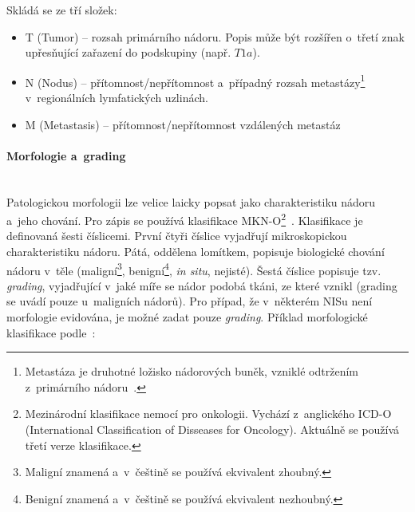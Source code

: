 \documentclass[11pt, final, oneside]{fithesis2}
\newcommand{\paragraphNewLine}[1]{\paragraph*{#1}\mbox{}\\}
\begin{document}
Skládá se ze tří složek:
\begin{itemize}
	\item T (Tumor) -- rozsah primárního nádoru. Popis může být rozšířen o~třetí znak upřesňující zařazení do podskupiny (např. $T1a$).
	
	\item N (Nodus) -- přítomnost/nepřítomnost a~případný rozsah metastázy\footnote{Metastáza je druhotné ložisko nádorových buněk, vzniklé odtržením z~primárního nádoru~\cite{metastaza}.} v~regionálních lymfatických uzlinách.
	\item M (Metastasis) -- přítomnost/nepřítomnost vzdálených metastáz
\end{itemize}

\paragraphNewLine{Morfologie a~grading}
Patologickou morfologii lze velice laicky popsat jako charakteristiku nádoru a~jeho chování. Pro zápis se používá klasifikace MKN-O\footnote{Mezinárodní klasifikace nemocí pro onkologii. Vychází z~anglického ICD-O (International Classification of Disseases for Oncology). Aktuálně se používá třetí verze klasifikace.}~\cite{MKN-O}. Klasifikace je definovaná šesti číslicemi. První čtyři číslice vyjadřují mikroskopickou charakteristiku nádoru. Pátá, oddělena lomítkem, popisuje biologické chování nádoru v~těle (maligní\footnote{Maligní znamená  a~v~češtině se používá ekvivalent zhoubný.}, benigní\footnote{Benigní znamená  a~v~češtině se používá ekvivalent nezhoubný.}, \textit{in situ}, nejisté). Šestá číslice popisuje tzv. \textit{grading}, vyjadřující v~jaké míře se nádor podobá tkáni, ze které vznikl (grading se uvádí pouze u~maligních nádorů). Pro případ, že v~některém NISu není morfologie evidována, je možné zadat pouze \textit{grading}.
Příklad morfologické klasifikace podle~\cite{MKN-O}:
\end{document}
